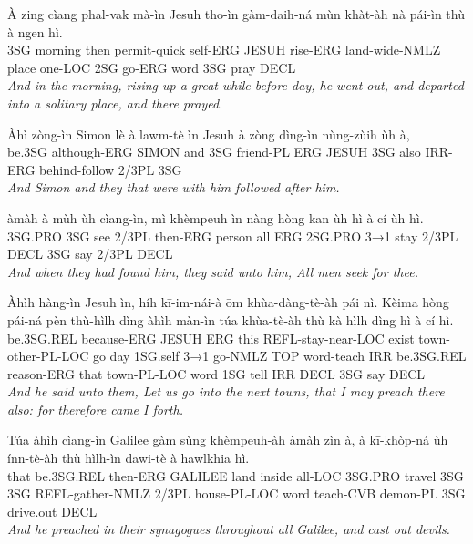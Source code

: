 \documentclass[11pt,a4paper]{article}
\begin{document}
\begin{exe}
\gll À zing cìang phal-vak mà-ìn Jesuh tho-ìn gàm-daih-ná mùn khàt-àh nà pái-ìn thù à ngen hì. \\
     3SG morning then permit-quick self-ERG JESUH rise-ERG land-wide-NMLZ place one-LOC 2SG go-ERG word 3SG pray DECL \\
\glt \textcolor{kjvcolor}{\textit{And in the morning, rising up a great while before day, he went out, and departed into a solitary place, and there prayed.}}

\gll Àhì zòng-ìn Simon lè à lawm-tè ìn Jesuh à zòng dìng-ìn nùng-zùih ùh à, \\
     be.3SG although-ERG SIMON and 3SG friend-PL ERG JESUH 3SG also IRR-ERG behind-follow 2/3PL 3SG \\
\glt \textcolor{kjvcolor}{\textit{And Simon and they that were with him followed after him.}}

\gll àmàh à mùh ùh cìang-ìn, mì khèmpeuh ìn nàng hòng kan ùh hì à cí ùh hì. \\
     3SG.PRO 3SG see 2/3PL then-ERG person all ERG 2SG.PRO 3→1 stay 2/3PL DECL 3SG say 2/3PL DECL \\
\glt \textcolor{kjvcolor}{\textit{And when they had found him, they said unto him, All men seek for thee.}}

\gll Àhìh hàng-ìn Jesuh ìn, híh kī-im-nái-à ōm khùa-dàng-tè-àh pái nì. Kèima hòng pái-ná pèn thù-hìlh dìng àhìh màn-ìn túa khùa-tè-àh thù kà hìlh dìng hì à cí hì. \\
     be.3SG.REL because-ERG JESUH ERG this REFL-stay-near-LOC exist town-other-PL-LOC go day 1SG.self 3→1 go-NMLZ TOP word-teach IRR be.3SG.REL reason-ERG that town-PL-LOC word 1SG tell IRR DECL 3SG say DECL \\
\glt \textcolor{kjvcolor}{\textit{And he said unto them, Let us go into the next towns, that I may preach there also: for therefore came I forth.}}

\gll Túa àhìh cìang-ìn Galilee gàm sùng khèmpeuh-àh àmàh zìn à, à kī-khòp-ná ùh ínn-tè-àh thù hìlh-ìn dawi-tè à hawlkhia hì. \\
     that be.3SG.REL then-ERG GALILEE land inside all-LOC 3SG.PRO travel 3SG 3SG REFL-gather-NMLZ 2/3PL house-PL-LOC word teach-CVB demon-PL 3SG drive.out DECL \\
\glt \textcolor{kjvcolor}{\textit{And he preached in their synagogues throughout all Galilee, and cast out devils.}}


\end{exe}
\end{document}
